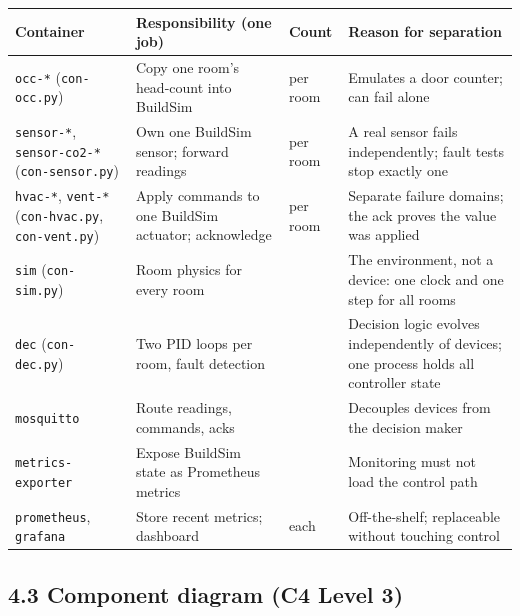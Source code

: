 \documentclass[11pt]{article}
\makeatletter
\DeclareRobustCommand{\_}{\ifmmode\nfss@text{\textunderscore}\else\textunderscore\allowbreak\fi}
\newcommand{\file}[1]{\texttt{#1}}
\makeatother
\begin{document}
\begin{longtable}[]{@{}
  >{\raggedright\arraybackslash}p{}
  >{\raggedright\arraybackslash}p{}
  >{\raggedright\arraybackslash}p{}
  >{\raggedright\arraybackslash}p{}@{}}
\toprule
\textbf{Container} & \textbf{Responsibility (one job)} & \textbf{Count} & \textbf{Reason for separation} \\
\midrule
\endhead
\file{occ-*} (\file{con-occ.py}) & Copy one room's head-count into BuildSim & per room & Emulates a door counter; can fail alone \\
\file{sensor-*}, \file{sensor-co2-*} (\file{con-sensor.py}) & Own one BuildSim sensor; forward readings & 2 per room & A real sensor fails independently; fault tests stop exactly one \\
\file{hvac-*}, \file{vent-*} (\file{con-hvac.py}, \file{con-vent.py}) & Apply commands to one BuildSim actuator; acknowledge & 2 per room & Separate failure domains; the ack proves the value was applied \\
\file{sim} (\file{con-sim.py}) & Room physics for every room & 1 & The environment, not a device: one clock and one step for all rooms \\
\file{dec} (\file{con-dec.py}) & Two PID loops per room, fault detection & 1 & Decision logic evolves independently of devices; one process holds all controller state \\
\file{mosquitto} & Route readings, commands, acks & 1 & Decouples devices from the decision maker \\
\file{metrics-exporter} & Expose BuildSim state as Prometheus metrics & 1 & Monitoring must not load the control path \\
\file{prometheus}, \file{grafana} & Store recent metrics; dashboard & 1 each & Off-the-shelf; replaceable without touching control \\
\bottomrule
\end{longtable}

\subsection{4.3 Component diagram (C4 Level 3)}
\end{document}
